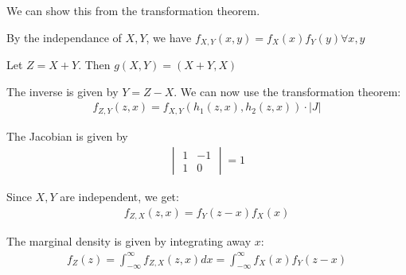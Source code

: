 \par\bigskip
\noindent We can show this from the transformation theorem.
\par\bigskip
\noindent By the independance of $X,Y$, we have $f_{X,Y}(x,y) = f_X(x)f_Y(y) \forall x,y$\par
Let $Z = X+Y$. Then $g(X,Y) = (X+Y,X)$\par
The inverse is given by $Y = Z-X$. We can now use the transformation theorem:
\begin{equation*}
  \begin{gathered}
    f_{Z,Y}(z,x) = f_{X,Y}(h_1(z,x), h_2(z,x))\cdot\left|J\right|
  \end{gathered}
\end{equation*}
\par\bigskip
\noindent The Jacobian is given by
\begin{equation*}
  \begin{gathered}
    \begin{vmatrix}1&-1\\1&0\end{vmatrix} = 1
  \end{gathered}
\end{equation*}\par
\noindent Since $X,Y$ are independent, we get:
\begin{equation*}
  \begin{gathered}
    f_{Z,X}(z,x) = f_Y(z-x)f_X(x)
  \end{gathered}
\end{equation*}\par
\noindent The marginal density is given by integrating away $x$:
\begin{equation*}
  \begin{gathered}
    f_Z(z) = \int_{-\infty}^{\infty}f_{Z,X}(z,x)dx = \int_{-\infty}^{\infty}f_X(x)f_Y(z-x)
  \end{gathered}
\end{equation*}
\par\bigskip
